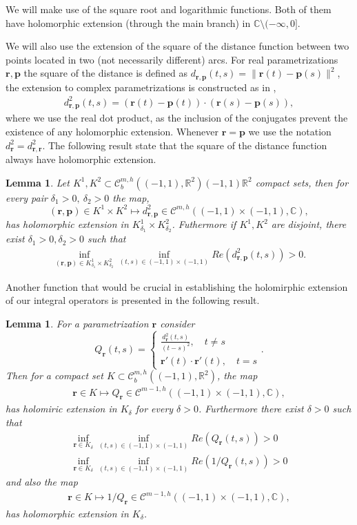 \documentclass{article}
\newtheorem{lemma}[theorem]{Lemma}
\newcommand{\IC}{{\mathbb C}}
\newcommand{\IR}{{\mathbb R}}
\newcommand{\bp}{{\bm p}}
\newcommand{\cmspaceh}[4]{\mathcal{C}^{#1,#2} \left( #3, #4 \right)}
\newcommand{\rgeoh}[2]{\mathcal{C}_b^{#1,#2}\left( (-1,1), \IR^2 \right)}
\newcommand{\br}{\bm{r}}
\newcommand{\iinterv}{(-1,1)\times(-1,1)}
\begin{document}
We will make use of the square root and logarithmic functions. Both of them have holomorphic extension (through the main branch) in $\IC \setminus (-\infty,0]$.

We will also use the extension of the square of the distance function between two points located in two (not necessarily different) arcs. For real  parametrizations $\br,\bp$ the square of the distance is defined as $d_{\br,\bp}(t,s) = \| \br(t)-\bp(s)\|^2$, the extension to complex parametrizations is constructed as in \cite{Henriquez2021}, 
\begin{align*}
d^2_{\br,\bp}(t,s) = {(\br(t)-\bp(t))\cdot(\br(s)-\bp(s))},
\end{align*}
where we use the real dot product, as the inclusion of the conjugates prevent the existence of any holomorphic extension. Whenever $\br = \bp$ we use the notation $d^2_{\br} = d^2_{\br,\br}$. The following result state that the square of the distance function always have holomorphic extension.  
\begin{lemma} 
\label{lemma:squaredistance}
Let $K^1,K^2 \subset \rgeoh{m}{h}{(-1,1)}{\IR^2}$ compact sets, then for every pair $\delta_1>0, \ \delta_2 > 0$ the map, $$(\br,\bp) \in K^1 \times K^2 \mapsto d_{\br,\bp}^2 \in \cmspaceh{m}{h}{\iinterv}{\IC},$$has holomorphic extension in $K^1_{\delta_1} \times K^2_{\delta_2}$. Futhermore if $K^1,K^2$ are disjoint, there exist $\delta_1>0,\delta_2>0$ such that 
\begin{align*}
\inf_{(\br,\bp) \in K^1_{\delta_1}  \times K^2_{\delta_2}} 
\inf_{(t,s)\in \iinterv}
Re(d_{\br,\bp}^2(t,s))>0.
\end{align*}
\end{lemma}
Another function that would be crucial in establishing the holomirphic extension of our integral operators is presented in the following result.
\begin{lemma}
\label{lemma:Qfun}
For a parametrization $\br$ consider
$$
Q_{\br}(t,s) = \begin{cases}
\frac{d^2_{\br}(t,s)}{(t-s)^2}, \quad t\neq s \\
\br '(t) \cdot \br '(t), \quad t =s 
\end{cases}.
$$
Then for a compact set $K \subset \rgeoh{m}{h}$, the map  
\begin{align*}
\br \in K \mapsto Q_{\br} \in \cmspaceh{m-1}{h}{(-1,1)\times(-1,1)}{\IC},
\end{align*}
has holomiric extension in $K_\delta$ for every $\delta>0$. Furthermore there exist $\delta >0$ such that 
\begin{align*}
\inf_{\br \in K_\delta} \inf_{(t,s) \in (-1,1)\times (-1,1)} Re(Q_{\br}(t,s)) >0 \\
\inf_{\br \in K_\delta} \inf_{(t,s) \in (-1,1)\times (-1,1)} Re(1/Q_{\br}(t,s)) >0 
\end{align*}
and also the map 
\begin{align*}
\br \in K \mapsto 1/Q_{\br} \in \cmspaceh{m-1}{h}{(-1,1)\times(-1,1)}{\IC}, 
\end{align*} 
has holomorphic extension in $K_\delta$.
\end{lemma} 
\end{document}
